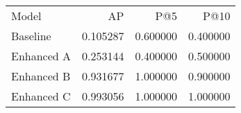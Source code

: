 \begin{tabular}{lrrr}
Model & AP & P@5 & P@10 \\
Baseline & 0.105287 & 0.600000 & 0.400000 \\
Enhanced A & 0.253144 & 0.400000 & 0.500000 \\
Enhanced B & 0.931677 & 1.000000 & 0.900000 \\
Enhanced C & 0.993056 & 1.000000 & 1.000000 \\
\end{tabular}
